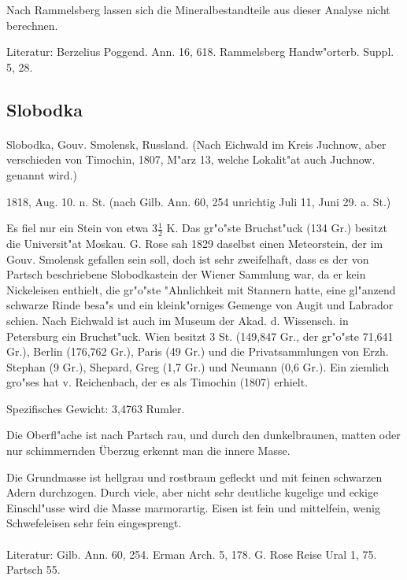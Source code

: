 \documentclass[a4paper, 11pt, oneside]{article}
\begin{document}
Nach Rammelsberg lassen sich die Mineralbestandteile aus dieser Analyse nicht berechnen.

\footnotesize
Literatur: Berzelius Poggend. Ann. 16, 618. Rammelsberg Handw"orterb. Suppl. 5, 28.
\subsection{Slobodka}
\normalsize
\paragraph{}
Slobodka, Gouv. Smolensk, Russland. (Nach Eichwald im Kreis Juchnow, aber verschieden von Timochin, 1807, M"arz 13, welche Lokalit"at auch Juchnow. genannt wird.)

1818, Aug. 10. n. St. (nach Gilb. Ann. 60, 254 unrichtig Juli 11, Juni 29. a. St.)

Es fiel nur ein Stein von etwa $3\frac{1}{2}$ K. Das gr"o"ste Bruchst"uck (134 Gr.) besitzt die Universit"at Moskau. G. Rose sah 1829 daselbst einen Meteorstein, der im Gouv. Smolensk gefallen sein soll, doch ist sehr zweifelhaft, dass es der von Partsch beschriebene Slobodkastein der Wiener Sammlung war, da er kein Nickeleisen enthielt, die gr"o"ste "Ahnlichkeit mit Stannern hatte, eine gl"anzend schwarze Rinde besa"s und ein kleink"orniges Gemenge von Augit und Labrador schien. Nach Eichwald ist auch im Museum der Akad. d. Wissensch. in Petersburg ein Bruchst"uck. Wien besitzt 3 St. (149,847 Gr., der gr"o"ste 71,641 Gr.), Berlin (176,762 Gr.), Paris (49 Gr.) und die Privatsammlungen von Erzh. Stephan (9 Gr.), Shepard, Greg (1,7 Gr.) und Neumann (0,6 Gr.). Ein ziemlich gro"ses hat v. Reichenbach, der es als Timochin (1807) erhielt.

Spezifisches Gewicht: 3,4763 Rumler.

Die Oberfl"ache ist nach Partsch rau, und durch den dunkelbraunen, matten oder nur schimmernden Überzug erkennt man die innere Masse.

Die Grundmasse ist hellgrau und rostbraun gefleckt und mit feinen schwarzen Adern durchzogen. Durch viele, aber nicht sehr deutliche kugelige und eckige Einschl"usse wird die Masse marmorartig. Eisen ist fein und mittelfein, wenig Schwefeleisen sehr fein eingesprengt.
\footnotesize
\paragraph{}
Literatur: Gilb. Ann. 60, 254. Erman Arch. 5, 178. G. Rose Reise Ural 1, 75. Partsch 55.
\end{document}
